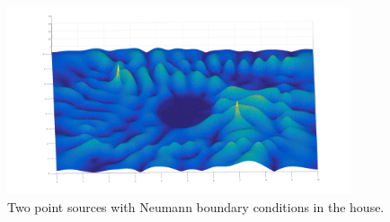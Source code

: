 \documentclass[10pt,a4paper]{article}
\begin{document}
\begin{figure}[H]
\centering
    \includegraphics[width=0.9\textwidth]{figures/house_doublesource.pdf}
	\caption{Two point sources with Neumann boundary conditions in the house.}
  \label{fig:house2sources}
\end{figure}
\end{document}
